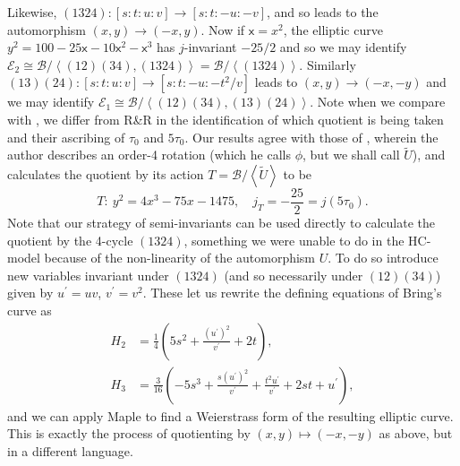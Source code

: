 \documentclass{amsart}
\newcommand{\pround}[1]{\left( #1 \right)}
\newcommand{\pangle}[1]{\left\langle #1 \right\rangle}
\begin{document}
Likewise, $(1324) : [s:t:u:v] \to [s:t:-u:-v]$, and so leads to the automorphism $(x,y) \to (-x,y)$. Now if $\mathsf{x}=x^2$, the elliptic curve
$y^2 = 100-25\mathsf{x}-10\mathsf{x}^2-\mathsf{x}^3$ has $j$-invariant
$-25/2$ and so we may identify $\mathcal{E}_2 \cong \mathcal{B}/\pangle{(12)(34), (1324)} = \mathcal{B}/\pangle{(1324)}$.
Similarly 
$(13)(24) : [s:t:u:v] \to [s:t:-u:-t^2/v]$ leads to $(x,y) \to (-x,-y)$
and
we may identify $\mathcal{E}_1 \cong \mathcal{B} / \pangle{(12)(34), (13)(24)}$. Note when we compare with \cite{Riera1992}, we differ from R\&R in the identification of which quotient is being taken and their ascribing of $\tau_0$ and $5\tau_0$. Our results agree with those of \cite{Weber2005}, wherein the author describes an order-4 rotation (which he calls $\phi$, but we shall call $\tilde{U}$), and calculates the quotient by its action $T=\mathcal{B}/\pangle{\tilde{U}}$ to be
$$
T:\ y^2=4 x^3-75 x -1475,\quad j_T=-\frac{25}{2} = j(5 \tau_0)  .
$$ 
Note that our strategy of semi-invariants can be used directly to calculate the quotient by the 4-cycle $(1324)$, something we were unable to do in the HC-model because of the non-linearity of the automorphism $U$. To do so introduce new variables invariant under $(1324)$ (and so necessarily under $(12)(34)$) given by $u^\prime = uv$, $v^\prime = v^2$. These let us rewrite the defining equations of Bring's curve as 
\begin{align*}
    H_2 &= \frac{1}{4} \pround{5s^2 + \frac{(u^\prime)^2}{v^\prime} + 2t}  , \\
    H_3 &= \frac{3}{16} \pround{-5 s^3 + \frac{s(u^\prime)^2}{v^\prime} + \frac{t^2u^\prime}{v^\prime} + 2st + u^\prime}  ,  
\end{align*}
and we can apply Maple to find a Weierstrass form of the resulting elliptic curve. This is exactly the process of quotienting by $(x,y) \mapsto (-x,-y)$ as above, but in a different language. 
\end{document}
